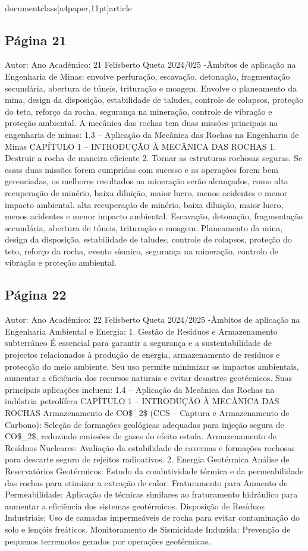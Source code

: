 \\documentclass[a4paper,11pt]{article}
\begin{document}
\subsection*{Página 21}
Autor:
Ano Académico:
21
Felisberto Queta
2024/025
-Âmbitos de aplicação na Engenharia de Minas:
envolve perfuração, escavação, detonação, fragmentação secundária,
abertura de túneis, trituração e moagem.
Envolve o planeamento da mina, design da disposição, estabilidade de 
taludes, controle de colapsos, proteção do teto, reforço da rocha, 
segurança na mineração, controle de vibração e proteção ambiental.
A mecânica das rochas tem duas missões principais na engenharia de minas:
1.3 – Aplicação da Mecânica das Rochas na Engenharia de Minas
CAPÍTULO 1 – INTRODUÇÃO À MECÂNICA DAS ROCHAS
1. Destruir a rocha de maneira eficiente
2. Tornar as estruturas rochosas seguras.
Se essas duas missões forem cumpridas com sucesso e as operações forem bem gerenciadas, os melhores resultados na 
mineração serão alcançados, como alta recuperação de minério, baixa diluição, maior lucro, menos acidentes e menor 
impacto ambiental.
alta recuperação de 
minério, baixa 
diluição, maior lucro, 
menos acidentes e 
menor impacto 
ambiental.
Escavação, detonação, 
fragmentação 
secundária, abertura de 
túneis, trituração e 
moagem.
Planeamento da mina, 
design da disposição, 
estabilidade de taludes, 
controle de colapsos, 
proteção do teto, reforço 
da rocha, evento 
sísmico, segurança na 
mineração, controlo de 
vibração e proteção 
ambiental.



\subsection*{Página 22}
Autor:
Ano Académico:
22
Felisberto Queta
2024/2025
-Âmbitos de aplicação na Engenharia Ambiental e Energia:
1. Gestão de Resíduos e Armazenamento subterrâneo
É essencial para garantir a segurança e a sustentabilidade de projectos relacionados à produção de energia,
armazenamento de resíduos e protecção do meio ambiente. Seu uso permite minimizar os impactos ambientais, aumentar a
eficiência dos recursos naturais e evitar desastres geotécnicos. Suas principais aplicações incluem:
1.4 – Aplicação da Mecânica das Rochas na indústria petrolífera
CAPÍTULO 1 – INTRODUÇÃO À MECÂNICA DAS ROCHAS
Armazenamento de CO\$\_2\$ (CCS – Captura e Armazenamento de Carbono):
Seleção de formações geológicas adequadas para injeção segura de CO\$\_2\$, reduzindo emissões de gases do efeito estufa.
Armazenamento de Resíduos Nucleares:
Avaliação da estabilidade de cavernas e formações rochosas para descarte seguro de rejeitos radioativos.
2. Energia Geotérmica
Análise de Reservatórios Geotérmicos:
Estudo da condutividade térmica e da permeabilidade das rochas para otimizar a extração de calor.
Fraturamento para Aumento de Permeabilidade:
Aplicação de técnicas similares ao fraturamento hidráulico para aumentar a eficiência dos sistemas geotérmicos.
Disposição de Resíduos Industriais:
Uso de camadas impermeáveis de rocha para evitar contaminação do solo e lençóis freáticos.
Monitoramento de Sismicidade Induzida:
Prevenção de pequenos terremotos gerados por operações geotérmicas.
\end{document}
